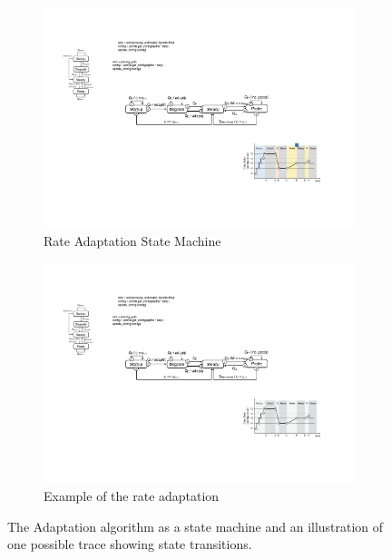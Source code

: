 \begin{figure}
  \begin{subfigure}[t]{\columnwidth}
    \centering
    \includegraphics[width=\columnwidth]{figures/cc.pdf}
    \caption{Rate Adaptation State Machine}
    \vspace{1em}
    \label{fig:cc-sm}
  \end{subfigure}
  \begin{subfigure}[t]{0.9\columnwidth}
    \centering
    \includegraphics[width=\columnwidth]{figures/cc2.pdf}
    \caption{Example of the rate adaptation}
    \label{fig:cc-ex}
  \end{subfigure}

  \caption{The Adaptation algorithm as a state machine and an illustration of
    one possible trace showing state transitions.}
  \label{fig:cc}
\end{figure}

